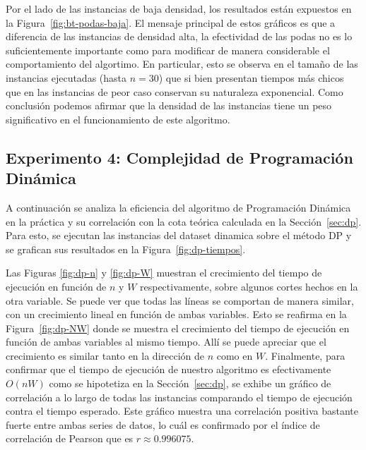 \documentclass[10pt,a4paper]{article}
\begin{document}
Por el lado de las instancias de baja densidad, los resultados están expuestos en la Figura~\ref{fig:bt-podas-baja}. El mensaje principal de estos gráficos es que a diferencia de las instancias de densidad alta, la efectividad de las podas no es lo suficientemente importante como para modificar de manera considerable el comportamiento del algortimo. En particular, esto se observa en el tamaño de las instancias ejecutadas (hasta $n = 30$) que si bien presentan tiempos más chicos que en las instancias de peor caso conservan su naturaleza exponencial. Como conclusión podemos afirmar que la densidad de las instancias tiene un peso significativo en el funcionamiento de este algoritmo.

\subsection{Experimento 4: Complejidad de Programación Dinámica}
A continuación se analiza la eficiencia del algoritmo de Programación Dinámica en la práctica y su correlación con la cota teórica calculada en la Sección~\ref{sec:dp}. Para esto, se ejecutan las instancias del dataset dinamica sobre el método DP y se grafican sus resultados en la Figura~\ref{fig:dp-tiempos}.

Las Figuras \ref{fig:dp-n} y \ref{fig:dp-W} muestran el crecimiento del tiempo de ejecución en función de $n$ y $W$ respectivamente, sobre algunos cortes hechos en la otra variable. Se puede ver que todas las líneas se comportan de manera similar, con un crecimiento lineal en función de ambas variables. Esto se reafirma en la Figura~\ref{fig:dp-NW} donde se muestra el crecimiento del tiempo de ejecución en función de ambas variables al mismo tiempo. Allí se puede apreciar que el crecimiento es similar tanto en la dirección de $n$ como en $W$. Finalmente, para confirmar que el tiempo de ejecución de nuestro algoritmo es efectivamente $O(nW)$ como se hipotetiza en la Sección~\ref{sec:dp}, se exhibe un gráfico de correlación a lo largo de todas las instancias comparando el tiempo de ejecución contra el tiempo esperado. Este gráfico muestra una correlación positiva bastante fuerte entre ambas series de datos, lo cuál es confirmado por el índice de correlación de Pearson que es $r \approx 0.996075$.
\end{document}
